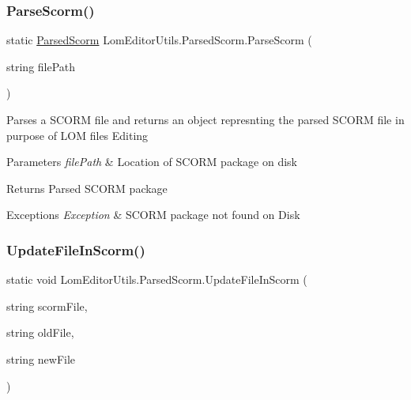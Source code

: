 \subsubsection{\texorpdfstring{Parse\+Scorm()}{ParseScorm()}}
{\footnotesize\ttfamily static \hyperlink{class_lom_editor_utils_1_1_parsed_scorm}{Parsed\+Scorm} Lom\+Editor\+Utils.\+Parsed\+Scorm.\+Parse\+Scorm (\begin{DoxyParamCaption}\item[{string}]{file\+Path }\end{DoxyParamCaption})\hspace{0.3cm}{\ttfamily [static]}}



Parses a S\+C\+O\+RM file and returns an object represnting the parsed S\+C\+O\+RM file in purpose of L\+OM files Editing 


\begin{DoxyParams}{Parameters}
{\em file\+Path} & Location of S\+C\+O\+RM package on disk\\
\hline
\end{DoxyParams}
\begin{DoxyReturn}{Returns}
Parsed S\+C\+O\+RM package
\end{DoxyReturn}

\begin{DoxyExceptions}{Exceptions}
{\em Exception} & S\+C\+O\+RM package not found on Disk\\
\hline
\end{DoxyExceptions}
\hypertarget{class_lom_editor_utils_1_1_parsed_scorm_af83ea5ea305876a63a3fe46270c84922}{}\label{class_lom_editor_utils_1_1_parsed_scorm_af83ea5ea305876a63a3fe46270c84922} 
\subsubsection{\texorpdfstring{Update\+File\+In\+Scorm()}{UpdateFileInScorm()}}
{\footnotesize\ttfamily static void Lom\+Editor\+Utils.\+Parsed\+Scorm.\+Update\+File\+In\+Scorm (\begin{DoxyParamCaption}\item[{string}]{scorm\+File,  }\item[{string}]{old\+File,  }\item[{string}]{new\+File }\end{DoxyParamCaption})\hspace{0.3cm}{\ttfamily [static]}}



